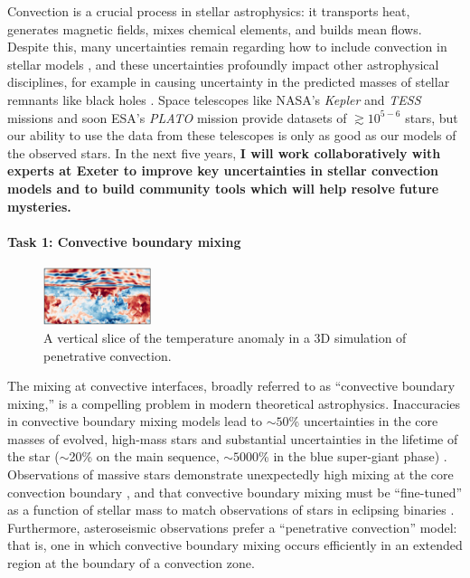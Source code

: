 \documentclass[12pt]{article}
\begin{document}
\thispagestyle{fancy}
Convection is a crucial process in stellar astrophysics: it transports heat, generates magnetic fields, mixes chemical elements, and builds mean flows.
Despite this, many uncertainties remain regarding how to include convection in stellar models \citep{kaiser_etal_2020}, and these uncertainties profoundly impact other astrophysical disciplines, for example in causing uncertainty in the predicted masses of stellar remnants like black holes \citep{farmer_etal_2019}.
Space telescopes like NASA's \emph{Kepler} and \emph{TESS} missions and soon ESA's \emph{PLATO} mission provide datasets of $\gtrsim 10^{5-6}$ stars, but our ability to use the data from these telescopes is only as good as our models of the observed stars.
In the next five years, \textbf{I will work collaboratively with experts at Exeter to improve key uncertainties in stellar convection models and to build community tools which will help resolve future mysteries.}




\paragraph*{Task 1: Convective boundary mixing}
\begin{figure}
	\begin{center}
	\vspace{-25pt}
    \includegraphics[width=0.28\textwidth]{./figs/penconv.png}
	\vspace{-16pt}
	\end{center}
    \caption{ A vertical slice of the temperature anomaly in a 3D simulation of penetrative convection.
	\label{fig:penconv} }
\end{figure}
The mixing at convective interfaces, broadly referred to as ``convective boundary mixing,'' is a compelling problem in modern theoretical astrophysics.
Inaccuracies in convective boundary mixing models lead to $\sim 50$\% uncertainties in the core masses of evolved, high-mass stars and substantial uncertainties in the lifetime of the star ($\sim$20\% on the main sequence, $\sim 5000$\% in the blue super-giant phase) \citep{kaiser_etal_2020}.
Observations of massive stars demonstrate unexpectedly high mixing at the core convection boundary \citep{johnston_2021}, and that convective boundary mixing must be ``fine-tuned'' as a function of stellar mass to match observations of stars in eclipsing binaries \citep{claret_torres_2018}.
Furthermore, asteroseismic observations \citep{pedersen_etal_2021} prefer a ``penetrative convection'' model: that is, one in which convective boundary mixing occurs efficiently in an extended region at the boundary of a convection zone.
\end{document}
